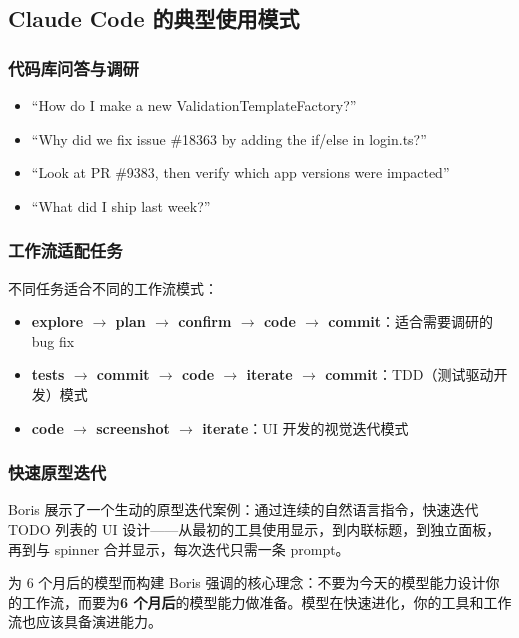\subsection{Claude Code 的典型使用模式}

\subsubsection{代码库问答与调研}

\begin{itemize}
    \item ``How do I make a new ValidationTemplateFactory?''
    \item ``Why did we fix issue \#18363 by adding the if/else in login.ts?''
    \item ``Look at PR \#9383, then verify which app versions were impacted''
    \item ``What did I ship last week?''
\end{itemize}

\subsubsection{工作流适配任务}

不同任务适合不同的工作流模式：
\begin{itemize}
    \item \textbf{explore $\rightarrow$ plan $\rightarrow$ confirm $\rightarrow$ code $\rightarrow$ commit}：适合需要调研的 bug fix
    \item \textbf{tests $\rightarrow$ commit $\rightarrow$ code $\rightarrow$ iterate $\rightarrow$ commit}：TDD（测试驱动开发）模式
    \item \textbf{code $\rightarrow$ screenshot $\rightarrow$ iterate}：UI 开发的视觉迭代模式
\end{itemize}

\subsubsection{快速原型迭代}

Boris 展示了一个生动的原型迭代案例：通过连续的自然语言指令，快速迭代 TODO 列表的 UI 设计——从最初的工具使用显示，到内联标题，到独立面板，再到与 spinner 合并显示，每次迭代只需一条 prompt。

\begin{importantbox}{为 6 个月后的模型而构建}
Boris 强调的核心理念：不要为今天的模型能力设计你的工作流，而要为\textbf{6 个月后}的模型能力做准备。模型在快速进化，你的工具和工作流也应该具备演进能力。
\end{importantbox}


